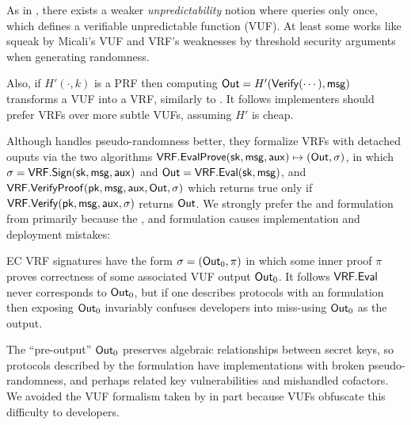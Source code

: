As in \cite{vrf_micali}, 
there exists a weaker {\em unpredictability} notion where \adv queries
only once, which defines a verifiable unpredictable function (VUF).
%
At least some works like \cite{agg_dkg} squeak by Micali's VUF and VRF's
weaknesses by threshold security arguments when generating randomness.

Also, if $H'(\cdot,k)$ is a PRF then computing ${\mathsf{Out}} = H'({\mathsf{Verify}}(\cdots), \mathsf{msg})$
transforms a VUF into a VRF, similarly to \cite[Proposition 1]{vrf_micali}.
It follows implementers should prefer VRFs over more subtle VUFs, assuming $H'$ is cheap.


\smallskip


Although \cite[\S3.2 $\fvrf$]{praos} handles pseudo-randomness better,
they formalize VRFs with detached ouputs via the two algorithms
${\mathsf{VRF}}.{\mathsf{EvalProve}}(\mathsf{sk},\mathsf{msg},\mathsf{aux}) \mapsto ({\mathsf{Out}},\sigma)$, in which $\sigma = {\mathsf{VRF}}.{\mathsf{Sign}}(\mathsf{sk},\mathsf{msg},\mathsf{aux})$ and ${\mathsf{Out}} = {\mathsf{VRF}}.{\mathsf{Eval}}(\mathsf{sk},\mathsf{msg})$, and
${\mathsf{VRF}}.{\mathsf{VerifyProof}}(\mathsf{pk},\mathsf{msg},\mathsf{aux},{\mathsf{Out}},\sigma)$ which returns true only if ${\mathsf{VRF}}.{\mathsf{Verify}}(\mathsf{pk},\mathsf{msg},\mathsf{aux},\sigma)$ returns ${\mathsf{Out}}$.
We strongly prefer the \Sign and \Verify formulation from \cite{agg_dkg}
primarily because the , and 
formulation causes implementation and deployment mistakes:

EC VRF signatures have the form $\sigma = ({\mathsf{Out}}_0,\pi)$ in which some
inner proof $\pi$ proves correctness of some associated VUF output ${\mathsf{Out}}_0$. %
It follows ${\mathsf{VRF}}.{\mathsf{Eval}}$ never corresponds to ${\mathsf{Out}}_0$, but if one describes
protocols with an  formulation then exposing ${\mathsf{Out}}_0$
invariably confuses developers into miss-using ${\mathsf{Out}}_0$ as the output.

The ``pre-output'' ${\mathsf{Out}}_0$ preserves algebraic relationships between
secret keys, so protocols described by the  formulation
have implementations with broken pseudo-randomness, and perhaps
 related key vulnerabilities and mishandled cofactors.
We avoided the VUF formalism taken by \cite{agg_dkg} in part because
 VUFs obfuscate this difficulty to developers.

